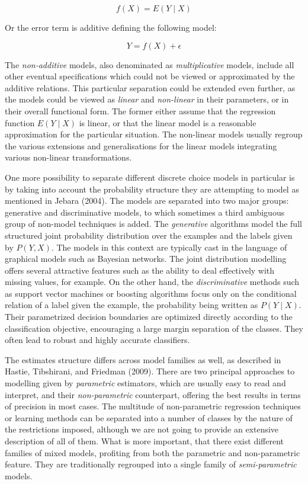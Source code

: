 \documentclass[12pt,]{article}
\begin{document}
\begin{equation}
f(X) = E(Y \mid X)
\end{equation}

Or the error term is additive defining the following model:

\begin{equation}
Y = f(X) + \epsilon
\end{equation}

The \emph{non-additive} models, also denominated as
\emph{multiplicative} models, include all other eventual specifications
which could not be viewed or approximated by the additive relations.
This particular separation could be extended even further, as the models
could be viewed as \emph{linear} and \emph{non-linear} in their
parameters, or in their overall functional form. The former either
assume that the regression function \(E(Y \mid X)\) is linear, or that
the linear model is a reasonable approximation for the particular
situation. The non-linear models usually regroup the various extensions
and generalisations for the linear models integrating various non-linear
transformations.

One more possibility to separate different discrete choice models in
particular is by taking into account the probability structure they are
attempting to model as mentioned in Jebara (2004). The models are
separated into two major groups: generative and discriminative models,
to which sometimes a third ambiguous group of non-model techniques is
added. The \emph{generative} algorithms model the full structured joint
probability distribution over the examples and the labels given by
\(P(Y, X)\). The models in this context are typically cast in the
language of graphical models such as Bayesian networks. The joint
distribution modelling offers several attractive features such as the
ability to deal effectively with missing values, for example. On the
other hand, the \emph{discriminative} methods such as support vector
machines or boosting algorithms focus only on the conditional relation
of a label given the example, the probability being written as
\(P(Y \mid X)\). Their parametrized decision boundaries are optimized
directly according to the classification objective, encouraging a large
margin separation of the classes. They often lead to robust and highly
accurate classifiers.

The estimates structure differs across model families as well, as
described in Hastie, Tibshirani, and Friedman (2009). There are two
principal approaches to modelling given by \emph{parametric} estimators,
which are usually easy to read and interpret, and their
\emph{non-parametric} counterpart, offering the best results in terms of
precision in most cases. The multitude of non-parametric regression
techniques or learning methods can be separated into a number of classes
by the nature of the restrictions imposed, although we are not going to
provide an extensive description of all of them. What is more important,
that there exist different families of mixed models, profiting from both
the parametric and non-parametric feature. They are traditionally
regrouped into a single family of \emph{semi-parametric} models.
\end{document}
